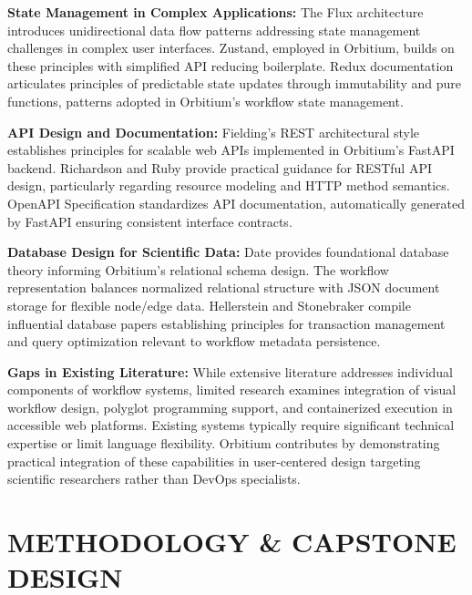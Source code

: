 \documentclass[12pt]{article}
\begin{document}
\hspace{\parindent}\textbf{State Management in Complex Applications:} The Flux architecture \cite{flux2014facebook} introduces unidirectional data flow patterns addressing state management challenges in complex user interfaces. Zustand, employed in Orbitium, builds on these principles with simplified API reducing boilerplate. Redux documentation \cite{redux2015abramov} articulates principles of predictable state updates through immutability and pure functions, patterns adopted in Orbitium's workflow state management.

\hspace{\parindent}\textbf{API Design and Documentation:} Fielding's \cite{fielding2000architectural} REST architectural style establishes principles for scalable web APIs implemented in Orbitium's FastAPI backend. Richardson and Ruby \cite{richardson2008restful} provide practical guidance for RESTful API design, particularly regarding resource modeling and HTTP method semantics. OpenAPI Specification \cite{openapi2021specification} standardizes API documentation, automatically generated by FastAPI ensuring consistent interface contracts.

\hspace{\parindent}\textbf{Database Design for Scientific Data:} Date \cite{date2003database} provides foundational database theory informing Orbitium's relational schema design. The workflow representation balances normalized relational structure with JSON document storage for flexible node/edge data. Hellerstein and Stonebraker \cite{hellerstein2005readings} compile influential database papers establishing principles for transaction management and query optimization relevant to workflow metadata persistence.

\hspace{\parindent}\textbf{Gaps in Existing Literature:} While extensive literature addresses individual components of workflow systems, limited research examines integration of visual workflow design, polyglot programming support, and containerized execution in accessible web platforms. Existing systems typically require significant technical expertise or limit language flexibility. Orbitium contributes by demonstrating practical integration of these capabilities in user-centered design targeting scientific researchers rather than DevOps specialists.

\newpage
\section{METHODOLOGY \& CAPSTONE DESIGN}
\end{document}
